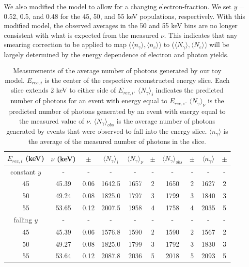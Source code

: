We also modified the model to allow for a changing electron-fraction. We set $y=$ 0.52, 0.5, and 0.48 for the 45, 50, and 55 keV populations, respectively. With this modified model, the observed averages in the 50 and 55 keV bins are no longer consistent with what is expected from the measured $\nu$. This indicates that any smearing correction to be applied to map ($\langle n_{\gamma}\rangle,\langle  n_{e}\rangle$) to ($\langle N_{\gamma}\rangle,\langle N_{e}\rangle$) will be largely determined by the energy dependence of electron and photon yields. 
\begin{table}[h!]
\centering
    \begin{tabular}{ c | c | c | c | c | c | c | c | c | c }
    \hline
    $E_{rec,i}$ (keV) & $\nu$ (keV) & $\pm$ & $\langle N_{\gamma} \rangle_{i}$  & $\langle N_{\gamma} \rangle_{\nu}$ & $\pm$ & $\langle N_{\gamma} \rangle_{obs}$ & $\pm$ & $\langle n_{\gamma} \rangle$ & $\pm$ \\
    \hline \hline
    constant $y$ &  - & - & - & - & - & - & - & - & -\\
    \hline \hline
    45 & 45.39 & 0.06 & 1642.5 &  1657 & 2 & 1650 & 2 & 1627 & 2 \\
    \hline
    50 &  49.24 & 0.08 & 1825.0 & 1797 & 3 & 1799 & 3 & 1840 & 3\\
    \hline
    55 & 53.65 & 0.12 & 2007.5 &  1958 & 4 & 1758 & 4 & 2035 & 5\\
    \hline \hline
    falling $y$ & - &  - & - & - & - & - & - & - & -\\
    \hline \hline
    45 & 45.39 & 0.06 & 1576.8  & 1590 & 2 & 1590 & 2 & 1567 & 2 \\
    \hline
    50 & 49.27 & 0.08 & 1825.0  & 1799 & 3 & 1792 & 3 & 1830 & 3\\
    \hline
    55 &  53.64 & 0.12  & 2087.8 & 2036 & 5 & 2018 & 5 & 2093 & 5\\
    \hline
    \end{tabular}
    \caption{Measurements of the average number of photons generated by our toy model. $E_{rec,i}$ is the center of the respective reconstructed energy slice. Each slice extends 2 keV to either side of $E_{rec,i}$. $\langle N_{\gamma} \rangle_{i}$ indicates the predicted number of photons for an event with energy equal to $E_{rec,i}$. $\langle N_{\gamma} \rangle_{\nu}$ is the predicted number of photons generated by an event with energy equal to the measured value of $\nu$. $\langle N_{\gamma} \rangle_{obs}$ is the average number of photons generated by events that were observed to fall into the energy slice. $\langle n_{\gamma} \rangle$ is the average of the measured number of photons in the slice.}
    \label{tab:toysmear}
\end{table}

